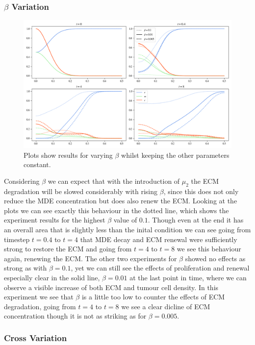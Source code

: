 \subsubsection*{$\beta$ Variation}
\begin{figure}[h]
    \centering
    \includegraphics[width=\textwidth]{resources/images/prolif_beta_variation.png}
    \caption{Plots show results for varying $\beta$ whilst keeping the other parameters constant.}
    \label{fig:prolif_beta_variation}
\end{figure}

Considering $\beta$ we can expect that with the introduction of $\mu_2$ the ECM degradation will be slowed considerably with rising $\beta$, since this does not only reduce the MDE concentration but does also renew the ECM. Looking at the plots we can see exactly this behaviour in the dotted line, which shows the experiment results for the highest $\beta$ value of $0.1$. Though even at the end it has an overall area that is slightly less than the inital condition we can see going from timestep $t=0.4$ to $t=4$ that MDE decay and ECM renewal were sufficiently strong to restore the ECM and going from $t=4$ to $t=8$ we see this behaviour again, renewing the ECM. The other two experiments for $\beta$ showed no effects as strong as with $\beta=0.1$, yet we can still see the effects of proliferation and renewal especially clear in the solid line, $\beta=0.01$ at the last point in time, where we can observe a visible increase of both ECM and tumour cell density. In this experiment we see that $\beta$ is a little too low to counter the effects of ECM degradation, going from $t=4$ to $t=8$ we see a clear dicline of ECM concentration though it is not as striking as for $\beta=0.005$. 

\subsubsection*{Cross Variation}

